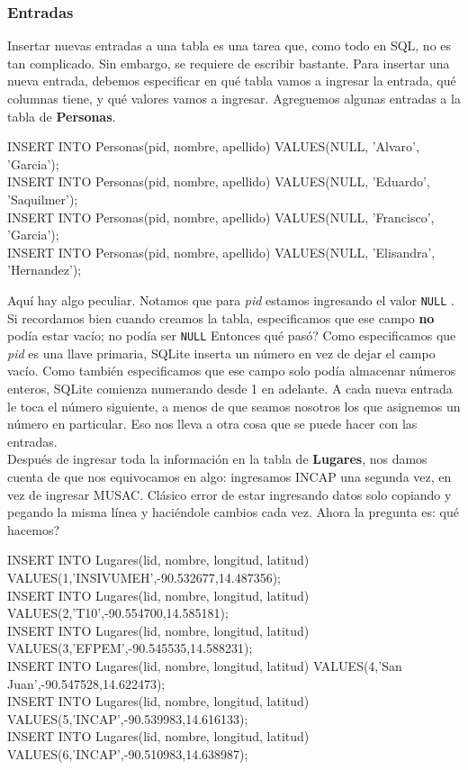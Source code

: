 \documentclass[10pt,letterpaper]{article}
\newcommand{\inlinecode}[1]{
\colorbox{light-gray}{\texttt{#1}}
}
\newenvironment{Code}
{
\begin{lrbox}{\selvestebox}%
\begin{minipage}{\dimexpr\columnwidth-2\fboxsep\relax}
\fontfamily{\ttdefault}\selectfont
}
{\end{minipage}\end{lrbox}%
\begin{center}
\colorbox{light-gray}{\usebox{\selvestebox}}
\end{center}
}
\begin{document}
\subsubsection{Entradas}
Insertar nuevas entradas a una tabla es una tarea que, como todo en SQL, no es tan complicado. Sin embargo, se requiere de escribir bastante. Para insertar una nueva entrada, debemos especificar en qu\'e tabla vamos a ingresar la entrada, qu\'e columnas tiene, y qu\'e valores vamos a ingresar. Agreguemos algunas entradas a la tabla de \textbf{Personas}.

\begin{Code}
INSERT INTO Personas(pid, nombre, apellido) VALUES(NULL, 'Alvaro', 'Garcia');\\
INSERT INTO Personas(pid, nombre, apellido) VALUES(NULL, 'Eduardo', 'Saquilmer');\\
INSERT INTO Personas(pid, nombre, apellido) VALUES(NULL, 'Francisco', 'Garcia');\\
INSERT INTO Personas(pid, nombre, apellido) VALUES(NULL, 'Elisandra', 'Hernandez');
\end{Code}

Aqu\'i hay algo peculiar. Notamos que para \emph{pid} estamos ingresando el valor \inlinecode{NULL}. Si recordamos bien cuando creamos la tabla, especificamos que ese campo \textbf{no} pod\'ia estar vac\'io; no pod\'ia ser \inlinecode{NULL} Entonces qu\'e pas\'o? Como especificamos que \emph{pid} es una llave primaria, SQLite inserta un n\'umero en vez de dejar el campo vac\'io. Como tambi\'en especificamos que ese campo solo pod\'ia almacenar n\'umeros enteros, SQLite comienza numerando desde 1 en adelante. A cada nueva entrada le toca el n\'umero siguiente, a menos de que seamos nosotros los que asignemos un n\'umero en particular. Eso nos lleva a otra cosa que se puede hacer con las entradas.\\

Despu\'es de ingresar toda la informaci\'on en la tabla de \textbf{Lugares}, nos damos cuenta de que nos equivocamos en algo: ingresamos INCAP una segunda vez, en vez de ingresar MUSAC. Cl\'asico error de estar ingresando datos solo copiando y pegando la misma l\'inea y haci\'endole cambios cada vez. Ahora la pregunta es: qu\'e hacemos?

\begin{Code}
INSERT INTO Lugares(lid, nombre, longitud, latitud) VALUES(1,'INSIVUMEH',-90.532677,14.487356);\\
INSERT INTO Lugares(lid, nombre, longitud, latitud) VALUES(2,'T10',-90.554700,14.585181);\\
INSERT INTO Lugares(lid, nombre, longitud, latitud) VALUES(3,'EFPEM',-90.545535,14.588231);\\
INSERT INTO Lugares(lid, nombre, longitud, latitud) VALUES(4,'San Juan',-90.547528,14.622473);\\
INSERT INTO Lugares(lid, nombre, longitud, latitud) VALUES(5,'INCAP',-90.539983,14.616133);\\
INSERT INTO Lugares(lid, nombre, longitud, latitud) VALUES(6,'INCAP',-90.510983,14.638987);
\end{Code}
\end{document}
